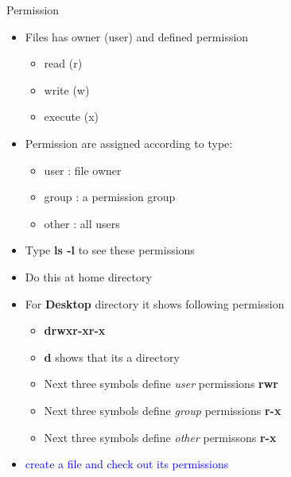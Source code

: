 \begin{frame}{Permission}
	\begin{itemize}
		\item Files has owner (user) and defined permission
		\begin{itemize}
			\item read (r)
			\item write (w)
			\item execute (x)
		\end{itemize} 
		\item Permission are assigned according to type:
		\begin{itemize}
			\item user : file owner
			\item group : a permission group
			\item other : all users
		\end{itemize}
		\item Type \textbf{ls -l} to see these permissions
		\item Do this at home directory
		\item For \textbf{Desktop} directory it shows following permission
		\begin{itemize}
			\item \textbf{drwxr-xr-x}
			\item \textbf{d} shows that its a directory
			\item Next three symbols define \textit{user} permissions \textbf{rwr}
			\item Next three symbols define \textit{group} permissions \textbf{r-x}
			\item Next three symbols define \textit{other} permissons \textbf{r-x}
		\end{itemize}
		\item \textcolor{blue}{create a file and check out its permissions}
	\end{itemize}
\end{frame}

